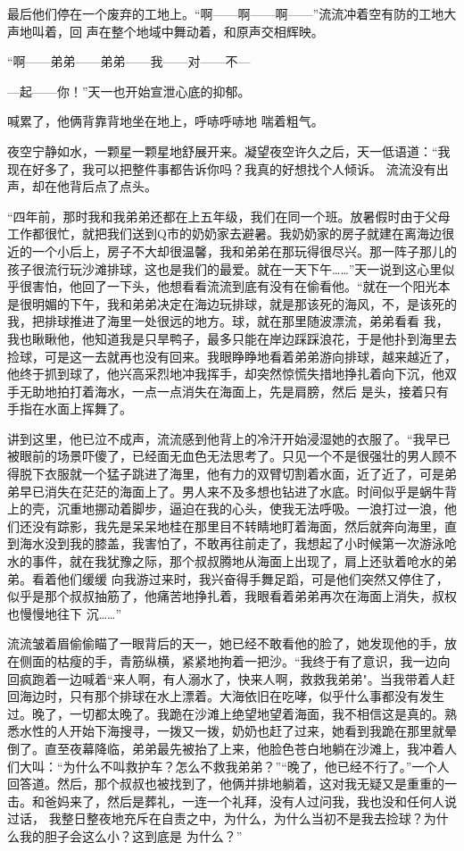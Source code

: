 \documentclass{article}
\begin{document}
最后他们停在一个废弃的工地上。“啊——啊——啊——”流流冲着空有防的工地大声地叫着，回
声在整个地域中舞动着，和原声交相辉映。 

“啊——弟弟——弟弟——我——对——不—
\newpage

—起——你！”天一也开始宣泄心底的抑郁。 

喊累了，他俩背靠背地坐在地上，呼哧呼哧地
喘着粗气。 

夜空宁静如水，一颗星一颗星地舒展开来。凝望夜空许久之后，天一低语道：“我现在好多了，我可以把整件事都告诉你吗？我真的好想找个人倾诉。
流流没有出声，却在他背后点了点头。 

“四年前，那时我和我弟弟还都在上五年级，我们在同一个班。放暑假时由于父母工作都很忙，就把我们送到Q市的奶奶家去避暑。我奶奶家的房子就建在离海边很近的一个小后上，房子不大却很温馨，我和弟弟在那玩得很尽兴。那一阵子那儿的孩子很流行玩沙滩排球，这也是我们的最爱。就在一天下午……”天一说到这心里似乎很害怕，他回了一下头，他想看看流流到底有没有在偷看他。“就在一个阳光本是很明媚的下午，我和弟弟决定在海边玩排球，就是那该死的海风，不，是该死的我，把排球推进了海里一处很远的地方。球，就在那里随波漂流，弟弟看看
\newpage
我，我也瞅瞅他，他知道我是只旱鸭子，最多只能在岸边踩踩浪花，于是他扑到海里去捡球，可是这一去就再也没有回来。我眼睁睁地看着弟弟游向排球，越来越近了，他终于抓到球了，他兴高采烈地冲我挥手，却突然惊慌失措地挣扎着向下沉，他双手无助地拍打着海水，一点一点消失在海面上，先是肩膀，然后
是头，接着只有手指在水面上挥舞了。 

讲到这里，他已泣不成声，流流感到他背上的冷汗开始浸湿她的衣服了。“我早已被眼前的场景吓傻了，已经面无血色无法思考了。只见一个不是很强壮的男人顾不得脱下衣服就一个猛子跳进了海里，他有力的双臂切割着水面，近了近了，可是弟弟早已消失在茫茫的海面上了。男人来不及多想也钻进了水底。时间似乎是蜗牛背上的壳，沉重地挪动着脚步，逼迫在我的心头，使我无法呼吸。一浪打过一浪，他们还没有踪影，我先是呆呆地桂在那里目不转睛地盯着海面，然后就奔向海里，直到海水没到我的膝盖，我害怕了，不敢再往前走了，我想起了小时候第一次游泳呛水的事件，就在我犹豫之际，那个叔叔腾地从海面上出现了，肩上还驮着呛水的弟弟。看着他们缓缓
\newpage
向我游过来时，我兴奋得手舞足蹈，可是他们突然又停住了，似乎是那个叔叔抽筋了，他痛苦地挣扎着，我眼看着弟弟再次在海面上消失，叔权也慢慢地往下
沉……” 

流流皱着眉偷偷瞄了一眼背后的天一，她已经不敢看他的脸了，她发现他的手，放在侧面的枯瘦的手，青筋纵横，紧紧地拘着一把沙。“我终于有了意识，我一边向回疯跑着一边喊着“来人啊，有人溺水了，快来人啊，救救我弟弟"。当我带着人赶回海边时，只有那个排球在水上漂着。大海依旧在吃哮，似乎什么事都没有发生过。晚了，一切都太晚了。我跪在沙滩上绝望地望着海面，我不相信这是真的。熟悉水性的人开始下海搜寻，一拨又一拨，奶奶也赶了过来，她看到我跪在那里就晕倒了。直至夜幕降临，弟弟最先被抬了上来，他脸色苍白地躺在沙滩上，我冲着人们大叫：“为什么不叫救护车？怎么不救我弟弟？”“晚了，他已经不行了。”一个人回答道。然后，那个叔叔也被找到了，他俩并排地躺着，这对我无疑又是重重的一击。和爸妈来了，然后是葬礼，一连一个礼拜，没有人过问我，我也没和任何人说过话，
\newpage
我整日整夜地充斥在自责之中，为什么，为什么当初不是我去捡球？为什么我的胆子会这么小？这到底是
为什么？” 
\end{document}
